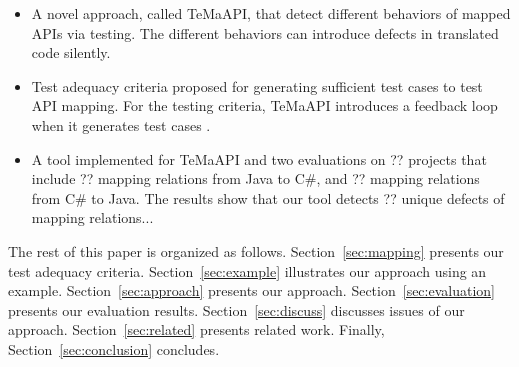 \begin{itemize}\vspace*{-1.5ex}
\item A novel approach, called TeMaAPI, that detect different behaviors of mapped APIs via testing. The different behaviors can introduce defects in translated code silently.\vspace*{-1.5ex}
\item Test adequacy criteria proposed for generating sufficient test cases to test API mapping. For the testing criteria, TeMaAPI introduces a feedback loop when it generates test cases .\vspace*{-1.5ex}
\item A tool implemented for TeMaAPI and two
evaluations on ?? projects that include ?? mapping relations from Java to C\#, and ?? mapping relations from C\# to Java. The results show that our tool detects ?? unique defects of mapping relations...
\end{itemize}\vspace*{-1.5ex}

The rest of this paper is organized as follows.
Section~\ref{sec:mapping} presents our test adequacy criteria.
Section~\ref{sec:example} illustrates our approach using an example.
Section~\ref{sec:approach} presents our approach.
Section~\ref{sec:evaluation} presents our evaluation results.
Section~\ref{sec:discuss} discusses issues of our approach.
Section~\ref{sec:related} presents related work.
Finally, Section~\ref{sec:conclusion} concludes.
